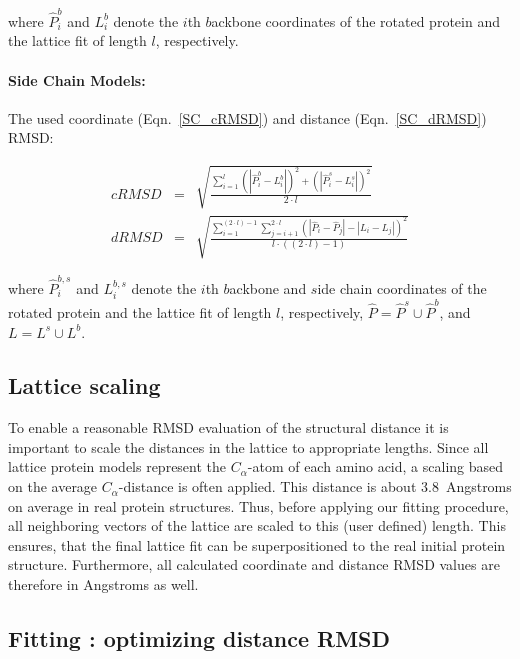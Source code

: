 \documentclass{article}
\newcommand{\CA}{$C_\alpha$}
\begin{document}
where $\hat{P}^b_i$ and $L^b_i$ denote the $i$th $b$ackbone coordinates of the 
rotated protein and the lattice fit of length $l$, respectively.


\paragraph{Side Chain Models:}

The used coordinate (Eqn.~\ref{SC_cRMSD}) and distance (Eqn.~\ref{SC_dRMSD})
RMSD:

{
\begin{eqnarray}
	cRMSD & = &
	\sqrt{\frac{\sum^{l}_{i=1}
		(|\hat{P}^b_i-L^b_i|)^2 + (|\hat{P}^s_i-L^s_i|)^2 
	}{2 \cdot l}} \label{SC_cRMSD}
	\\
	dRMSD & = &
	\sqrt{\frac{\sum^{(2\cdot l)-1}_{i=1}\sum^{2\cdot l}_{j=i+1}
		(|\hat{P}_i-\hat{P}_j|-|L_i-L_j|)^2 
	}{l \cdot ((2\cdot l)-1)}} \label{SC_dRMSD} 
\end{eqnarray}
}

where $\hat{P}^{b,s}_i$ and $L^{b,s}_i$ denote the $i$th $b$ackbone and $s$ide
chain coordinates of the rotated protein and the lattice fit of length $l$,
respectively, $\hat{P}=\hat{P}^s \cup \hat{P}^b$, and $L=L^s \cup L^b$.



\subsection{Lattice scaling}
\label{sec:lattice-scaling}


To enable a reasonable RMSD evaluation of the structural distance it is
important to scale the distances in the lattice to appropriate lengths. Since
all lattice protein models represent the \CA-atom of each amino acid, a scaling
based on the average \CA-distance is often applied. This distance is about
3.8~Angstroms on average in real protein structures. Thus, before applying our
fitting procedure, all neighboring vectors of the lattice are scaled to this
(user defined) length. This ensures, that the final lattice fit can be
superpositioned to the real initial protein structure. Furthermore, all
calculated coordinate and distance RMSD values are therefore in Angstroms as
well.



\subsection{Fitting : optimizing distance RMSD}
\label{sec:fit:dRMSD}
\end{document}
